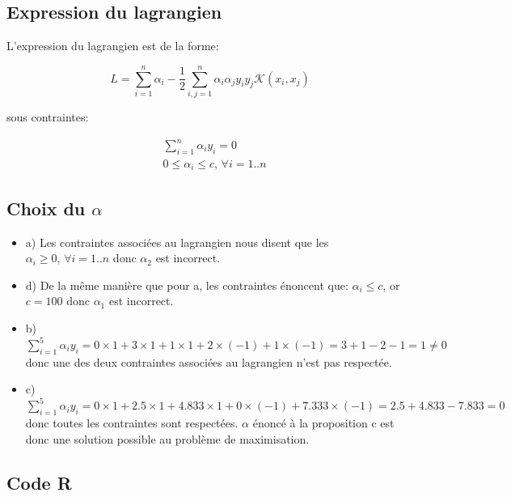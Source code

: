 \documentclass{article}
\begin{document}
\begin{multicols}{2}
\subsection{Expression du lagrangien}\label{subsec:ex31}

L'expression du lagrangien est de la forme:

\begin{equation}
    L = \sum_{i = 1}^n \alpha_i - \frac{1}{2} \sum_{i,j = 1}^n \alpha_i
    \alpha_j y_i y_j \mathcal{K}(x_i, x_j)
\end{equation}

sous contraintes:

\begin{equation}
    \begin{split}
        & \sum_{i = 1}^n \alpha_i y_i = 0 \\
        & 0 \leq \alpha_i \leq c, \, \forall i = 1..n
    \end{split}
\end{equation}

\subsection{Choix du $\alpha$}\label{subsec:ex32}

\begin{itemize}
    \item a) Les contraintes associées au lagrangien nous disent que les
        $\alpha_i \geq 0, \, \forall i = 1..n$ donc $\alpha_2$ est incorrect.
    \item d) De la même manière que pour a, les contraintes énoncent que:
        $\alpha_i \leq c$, or $c = 100$ donc $\alpha_1$ est incorrect.
    \item b) $\sum_{i = 1}^5 \alpha_i y_i = 0 \times 1 + 3 \times 1 + 1 \times
        1 + 2 \times (-1) + 1 \times (-1) = 3 + 1 - 2 - 1 = 1 \neq 0$ donc une
        des deux contraintes associées au lagrangien n'est pas respectée.
    \item c) $\sum_{i = 1}^5 \alpha_i y_i = 0 \times 1 + 2.5 \times 1 +
        4.833 \times 1 + 0 \times (-1) + 7.333 \times (-1) = 2.5 + 4.833 - 7.833
        = 0$ donc toutes les contraintes sont respectées. $\alpha$ énoncé à la
        proposition c est donc une solution possible au problème de
        maximisation.
\end{itemize}

\subsection{Code R}\label{subsec:ex33}


\end{multicols}
\end{document}
